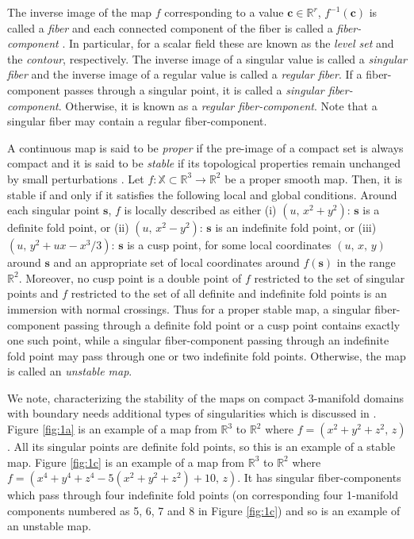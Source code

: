 \documentclass[twocolumn]{article}
\newcommand{\bc}{\mathbf{c}}
\newcommand{\bs}{\mathbf{s}}
\newcommand{\X}{\mathbb{X}}
\newcommand{\R}{\mathbb{R}}
\newcommand{\figref}[1]{Figure \ref{fig:#1}}
\begin{document}
The inverse image of the map $f$ corresponding to a
value $\bc\in \mathbb{R}^r$, $f^{-1}(\bc)$ is called a \textit{fiber}  and each
connected component of the fiber is called a \emph{fiber-component}
\cite{Saeki2014, 2004-Saeki}. In particular, for a scalar field these are known as
the \emph{level set} and the \emph{contour}, respectively.
The inverse image of a singular value is called a \textit{singular fiber} and the inverse image
of a regular value is called a \textit{regular fiber}. If a
fiber-component passes through a singular point, it is called a \emph{singular
fiber-component}. Otherwise, it is known as a \emph{regular
fiber-component}. Note that a singular fiber may contain a regular fiber-component.


A continuous map is said to be \emph{proper} if the pre-image
of a compact set is always compact and  it is said to be \emph{stable} if its topological properties remain unchanged
by small perturbations \cite{Levine1985}. 
Let $f : \X \subset \R^3 \to \R^2$ be a proper smooth map. Then, it is stable if and only if it satisfies the following local and global conditions.
Around each singular
point $\bs$, $f$ is locally described as either (i) $(u,\,
x^2+y^2)$: $\bs$ is a definite fold point, or (ii) $(u,\, x^2-y^2)$: $\bs$ is an indefinite fold point, or (iii) $(u,\,
y^2+ux-x^3/3)$: $\bs$ is a cusp point, for some local coordinates $(u,\, x,\, y)$  around $\bs$
and an appropriate set of local coordinates around $f(\bs)$ in the range $\R^2$.
Moreover, no cusp point is a double point of $f$ restricted to the set
of singular points and $f$ restricted to the set of all definite and
indefinite fold points is an immersion with normal crossings. 
Thus for a proper stable map, a singular fiber-component passing through a definite fold
point or a cusp point contains exactly one such point, while
a singular fiber-component passing through an indefinite fold point may pass through one or two indefinite fold
points. Otherwise, the map is called an \emph{unstable map}.


We note, characterizing the stability of the maps on compact 3-manifold domains with boundary 
needs additional types of singularities which is discussed in \cite{Saeki2015}.
\figref{1a} is an example of a map from $\R^3$ to $\R^2$ where $f=(x^2+y^2+z^2,\,z)$.
All its singular points are definite fold points, so this is an example of a stable map. \figref{1c}
is an example of a map from $\R^3$ to $\R^2$ where $f=(x^4 + y^4 + z^4 - 5(x^2 + y^2 +
  z^2) + 10, \, z)$. It has singular fiber-components which pass
  through four indefinite fold points (on corresponding four 1-manifold components
  numbered as 5, 6, 7 and 8 in \figref{1c}) and so is an example of an unstable map. 
\end{document}
